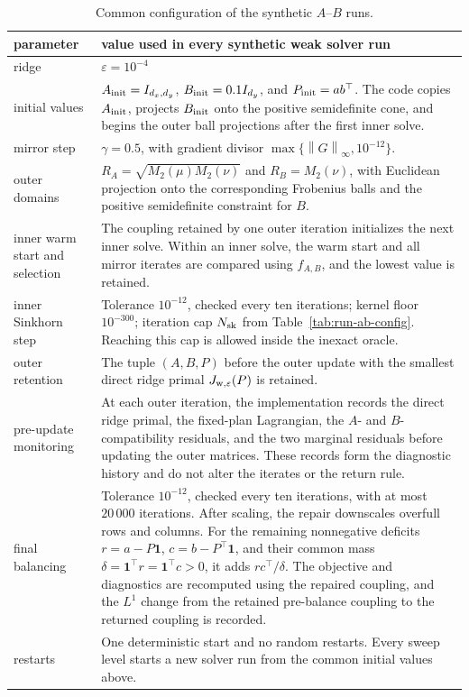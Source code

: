 \documentclass[11pt]{article}
\newcommand{\norm}[1]{\left\lVert #1\right\rVert}
\theoremstyle{plain}
\theoremstyle{definition}
\theoremstyle{remark}
\begin{document}
\begin{table}[H]
\centering
\footnotesize
\begin{tabularx}{\textwidth}{@{}>{\raggedright\arraybackslash}p{}X@{}}
\toprule
parameter & value used in every synthetic weak solver run\\
\midrule
ridge & \(\varepsilon=10^{-4}\)\\
initial values &
\(A_{\rm init}=I_{d_x,d_y}\), \(B_{\rm init}=0.1I_{d_y}\), and
\(P_{\rm init}=ab^\top\). The code copies \(A_{\rm init}\), projects
\(B_{\rm init}\) onto the positive semidefinite cone, and begins the outer ball
projections after the first inner solve.\\
mirror step &
\(\gamma=0.5\), with gradient divisor
\(\max\{\norm{G}_\infty,10^{-12}\}\).\\
outer domains &
\(R_A=\sqrt{M_2(\mu)M_2(\nu)}\) and \(R_B=M_2(\nu)\), with Euclidean
projection onto the corresponding Frobenius balls and the positive semidefinite
constraint for \(B\).\\
inner warm start and selection &
The coupling retained by one outer iteration initializes the next inner solve.
Within an inner solve, the warm start and all mirror iterates are compared using
\(f_{A,B}\), and the lowest value is retained.\\
inner Sinkhorn step &
Tolerance \(10^{-12}\), checked every ten iterations; kernel floor
\(10^{-300}\); iteration cap \(N_{\rm sk}\) from
Table~\ref{tab:run-ab-config}. Reaching this cap is allowed inside the inexact
oracle.\\
outer retention &
The tuple \((A,B,P)\) before the outer update with the smallest direct ridge primal
\(J_{\rm w,\varepsilon}(P)\) is retained.\\
pre-update monitoring &
At each outer iteration, the implementation records the direct ridge primal, the
fixed-plan Lagrangian, the \(A\)- and \(B\)-compatibility residuals, and the two
marginal residuals before updating the outer matrices. These records form the
diagnostic history and do not alter the iterates or the return rule.\\
final balancing &
Tolerance \(10^{-12}\), checked every ten iterations, with at most
\(20\,000\) iterations. After scaling, the repair downscales overfull rows and
columns. For the remaining nonnegative deficits
\(r=a-P\mathbf 1\), \(c=b-P^\top\mathbf 1\), and their common mass
\(\delta=\mathbf 1^\top r=\mathbf 1^\top c>0\), it adds
\(rc^\top/\delta\). The objective and diagnostics are recomputed using the
repaired coupling, and the \(L^1\) change from the retained pre-balance
coupling to the returned coupling is recorded.\\
restarts &
One deterministic start and no random restarts. Every sweep level starts a new
solver run from the common initial values above.\\
\bottomrule
\end{tabularx}
\caption{Common configuration of the synthetic \(A\)--\(B\) runs.}
\label{tab:common-ab-config}
\end{table}
\end{document}
